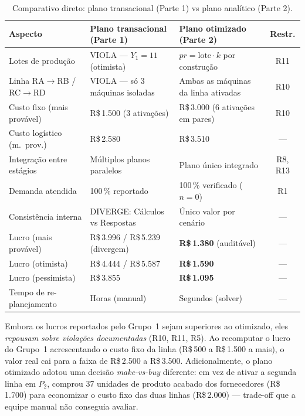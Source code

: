 \documentclass[11pt,a4paper]{article}
\newcommand{\rs}{R\$\,}
\begin{document}
\begin{table}[h]
\centering
\caption{Comparativo direto: plano transacional (Parte 1) vs plano analítico (Parte 2).}
\label{tab:comparativo}
\small
\begin{tabular}{p{4.6cm}p{4.8cm}p{4.8cm}c}
\toprule
\textbf{Aspecto} & \textbf{Plano transacional (Parte 1)} & \textbf{Plano otimizado (Parte 2)} & \textbf{Restr.} \\
\midrule
Lotes de produção           & VIOLA — $Y_1 = 11$ (otimista)        & $pr = \text{lote}\cdot k$ por construção & R11 \\
Linha RA$\to$RB / RC$\to$RD & VIOLA — só 3 máquinas isoladas       & Ambas as máquinas da linha ativadas & R10 \\
Custo fixo (mais provável)  & \rs1.500 (3 ativações)               & \rs3.000 (6 ativações em pares) & R10 \\
Custo logístico (m.\ prov.) & \rs2.580                              & \rs3.510                              & — \\
Integração entre estágios   & Múltiplos planos paralelos            & Plano único integrado                 & R8, R13 \\
Demanda atendida            & 100\,\% reportado                     & 100\,\% verificado ($n=0$)            & R1 \\
Consistência interna        & DIVERGE: Cálculos vs Respostas        & Único valor por cenário               & — \\
Lucro (mais provável)       & \rs3.996 / \rs5.239 (divergem)        & \textbf{\rs1.380} (auditável)        & — \\
Lucro (otimista)            & \rs4.444 / \rs5.587                   & \textbf{\rs1.590}                     & — \\
Lucro (pessimista)          & \rs3.855                              & \textbf{\rs1.095}                     & — \\
Tempo de re-planejamento    & Horas (manual)                        & Segundos (solver)                     & — \\
\bottomrule
\end{tabular}
\end{table}

Embora os lucros reportados pelo Grupo~1 sejam superiores ao otimizado, eles \emph{repousam sobre violações documentadas} (R10, R11, R5). Ao recomputar o lucro do Grupo~1 acrescentando o custo fixo da linha (\rs 500 a \rs 1.500 a mais), o valor real cai para a faixa de \rs 2.500 a \rs 3.500. Adicionalmente, o plano otimizado adotou uma decisão \emph{make-vs-buy} diferente: em vez de ativar a segunda linha em $P_2$, comprou 37 unidades de produto acabado dos fornecedores (\rs1.700) para economizar o custo fixo das duas linhas (\rs2.000) — trade-off que a equipe manual não conseguia avaliar.
\end{document}
